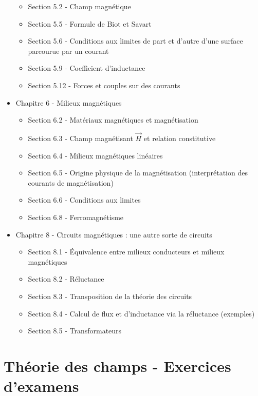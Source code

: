 \begin{itemize}
	    \begin{itemize}
	        \item Section 5.2 - Champ magnétique 
	        \item Section 5.5 - Formule de Biot et Savart
	        \item Section 5.6 - Conditions aux limites de part et d'autre d'une surface parcourue par un courant
	        \item Section 5.9 - Coefficient d'inductance
	        \item Section 5.12 - Forces et couples sur des courants
	    \end{itemize}
	\item Chapitre 6 - Milieux magnétiques
	    \begin{itemize}
	        \item Section 6.2 - Matériaux magnétiques et magnétisation
	        \item Section 6.3 - Champ magnétisant $\Vec{H}$ et relation constitutive
	        \item Section 6.4 - Milieux magnétiques linéaires
	        \item Section 6.5 - Origine physique de la magnétisation (interprétation des courants de magnétisation)
	        \item Section 6.6 - Conditions aux limites
	        \item Section 6.8 - Ferromagnétisme
	    \end{itemize}
	\item Chapitre 8 - Circuits magnétiques : une autre sorte de circuits
	    \begin{itemize}
	        \item Section 8.1 - Équivalence entre milieux conducteurs et milieux magnétiques 
	        \item Section 8.2 - Réluctance
	        \item Section 8.3 - Transposition de la théorie des circuits
	        \item Section 8.4 - Calcul de flux et d'inductance via la réluctance (exemples)
	        \item Section 8.5 - Transformateurs
	    \end{itemize}
\end{itemize}

\vspace{5pt}

\newpage

\section{Théorie des champs - Exercices d'examens}
